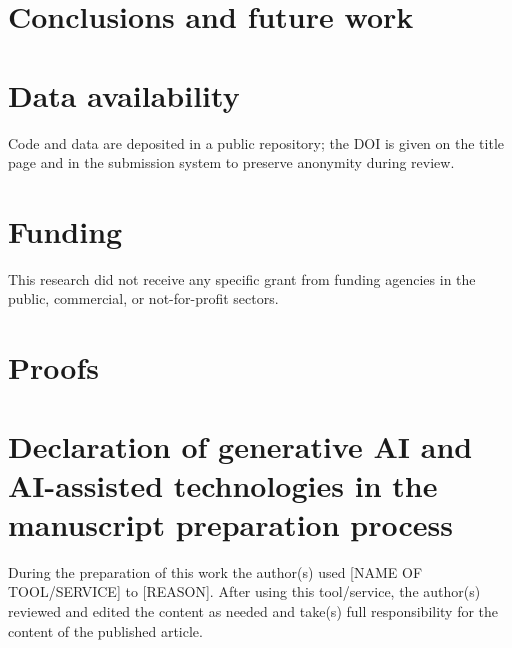 \documentclass[preprint,12pt,authoryear]{elsarticle}
\begin{document}
\section{Conclusions and future work}\label{sec:conclusion}

\section*{Data availability}
Code and data are deposited in a public repository; the DOI is given on the title page and
in the submission system to preserve anonymity during review.

\section*{Funding}
This research did not receive any specific grant from funding agencies in the public,
commercial, or not-for-profit sectors.

\appendix
\section{Proofs}\label{app:proofs}

\section*{Declaration of generative AI and AI-assisted technologies in the manuscript preparation process}
During the preparation of this work the author(s) used [NAME OF TOOL/SERVICE] to [REASON].
After using this tool/service, the author(s) reviewed and edited the content as needed and
take(s) full responsibility for the content of the published article.



\end{document}
